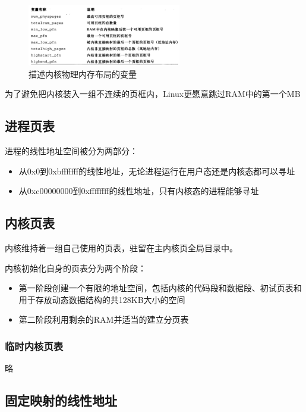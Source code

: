 \begin{figure}[!htbp]
    \centering
    \includegraphics[width=0.6\textwidth]{image/chapter02/内核物理内存布局的变量.png}
    \caption{描述内核物理内存布局的变量}
\end{figure}

    为了避免把内核装入一组不连续的页框内，Linux更愿意跳过RAM中的第一个MB

\subsection{进程页表}

    进程的线性地址空间被分为两部分：

\begin{itemize}
    \item 从0x0到0xbfffffff的线性地址，无论进程运行在用户态还是内核态都可以寻址
    \item 从0xc00000000到0xffffffff的线性地址，只有内核态的进程能够寻址
\end{itemize}

\subsection{内核页表}

    内核维持着一组自己使用的页表，驻留在主内核页全局目录中。

    内核初始化自身的页表分为两个阶段：

\begin{itemize}
    \item 第一阶段创建一个有限的地址空间，包括内核的代码段和数据段、初试页表和用于存放动态数据结构的共128KB大小的空间
    \item 第二阶段利用剩余的RAM并适当的建立分页表
\end{itemize}

\subsubsection{临时内核页表}

    略

\subsection{固定映射的线性地址}

